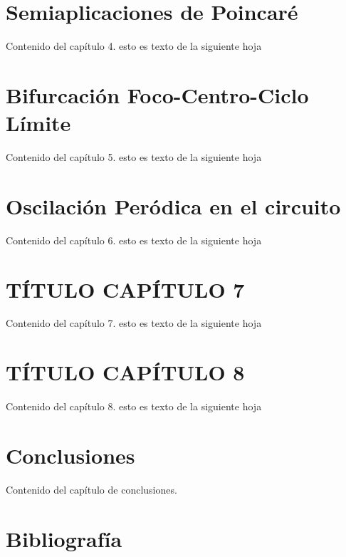 \documentclass[12pt,a4paper]{report} %
\begin{document}
	\chapter{Semiaplicaciones de Poincaré}
	Contenido del capítulo 4.
	\newpage
	esto es texto de la siguiente hoja
	
	\chapter{Bifurcación Foco-Centro-Ciclo Límite}
	Contenido del capítulo 5.
	\newpage
	esto es texto de la siguiente hoja
	
	\chapter{Oscilación Peródica en el circuito}
	Contenido del capítulo 6.
	\newpage
	esto es texto de la siguiente hoja
	
	\chapter{TÍTULO CAPÍTULO 7}
	Contenido del capítulo 7.
	\newpage
	esto es texto de la siguiente hoja
	
	\chapter{TÍTULO CAPÍTULO 8}
	Contenido del capítulo 8.
	\newpage
	esto es texto de la siguiente hoja
	
	\chapter*{Conclusiones}
	Contenido del capítulo de conclusiones.
	\newpage
	
	\chapter*{Bibliografía}
	
\end{document}
